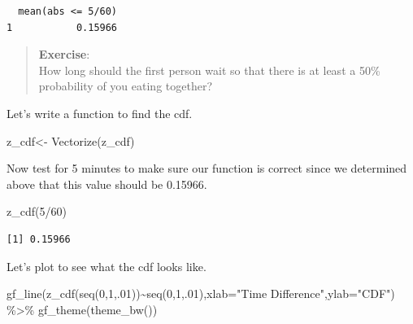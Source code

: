 \documentclass[
  letterpaper,
  DIV=11,
  numbers=noendperiod]{scrreprt}
\newenvironment{Shaded}{\begin{snugshade}}{\end{snugshade}}
\newcommand{\AttributeTok}[1]{\textcolor[rgb]{0.40,0.45,0.13}{#1}}
\newcommand{\ControlFlowTok}[1]{\textcolor[rgb]{0.00,0.23,0.31}{#1}}
\newcommand{\DecValTok}[1]{\textcolor[rgb]{0.68,0.00,0.00}{#1}}
\newcommand{\FunctionTok}[1]{\textcolor[rgb]{0.28,0.35,0.67}{#1}}
\newcommand{\NormalTok}[1]{\textcolor[rgb]{0.00,0.23,0.31}{#1}}
\newcommand{\OtherTok}[1]{\textcolor[rgb]{0.00,0.23,0.31}{#1}}
\newcommand{\SpecialCharTok}[1]{\textcolor[rgb]{0.37,0.37,0.37}{#1}}
\newcommand{\StringTok}[1]{\textcolor[rgb]{0.13,0.47,0.30}{#1}}
\begin{document}
\begin{verbatim}
  mean(abs <= 5/60)
1           0.15966
\end{verbatim}

\begin{quote}
\textbf{Exercise}:\\
How long should the first person wait so that there is at least a 50\%
probability of you eating together?
\end{quote}

Let's write a function to find the cdf.

\begin{Shaded}
\end{Shaded}

\begin{Shaded}
\begin{Highlighting}[]
\NormalTok{z\_cdf}\OtherTok{\textless{}{-}} \FunctionTok{Vectorize}\NormalTok{(z\_cdf)}
\end{Highlighting}
\end{Shaded}

Now test for 5 minutes to make sure our function is correct since we
determined above that this value should be 0.15966.

\begin{Shaded}
\begin{Highlighting}[]
\FunctionTok{z\_cdf}\NormalTok{(}\DecValTok{5}\SpecialCharTok{/}\DecValTok{60}\NormalTok{)}
\end{Highlighting}
\end{Shaded}

\begin{verbatim}
[1] 0.15966
\end{verbatim}

Let's plot to see what the cdf looks like.

\begin{Shaded}
\begin{Highlighting}[]
\FunctionTok{gf\_line}\NormalTok{(}\FunctionTok{z\_cdf}\NormalTok{(}\FunctionTok{seq}\NormalTok{(}\DecValTok{0}\NormalTok{,}\DecValTok{1}\NormalTok{,.}\DecValTok{01}\NormalTok{))}\SpecialCharTok{\textasciitilde{}}\FunctionTok{seq}\NormalTok{(}\DecValTok{0}\NormalTok{,}\DecValTok{1}\NormalTok{,.}\DecValTok{01}\NormalTok{),}\AttributeTok{xlab=}\StringTok{"Time Difference"}\NormalTok{,}\AttributeTok{ylab=}\StringTok{"CDF"}\NormalTok{) }\SpecialCharTok{\%\textgreater{}\%}
  \FunctionTok{gf\_theme}\NormalTok{(}\FunctionTok{theme\_bw}\NormalTok{())}
\end{Highlighting}
\end{Shaded}
\end{document}
